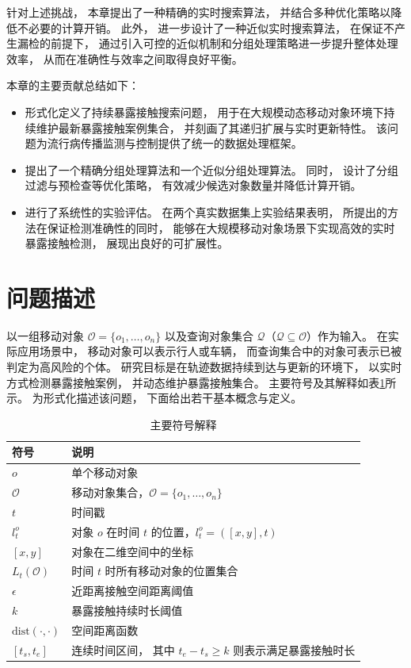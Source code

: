针对上述挑战， 本章提出了一种精确的实时搜索算法， 并结合多种优化策略以降低不必要的计算开销。 此外， 进一步设计了一种近似实时搜索算法， 在保证不产生漏检的前提下， 通过引入可控的近似机制和分组处理策略进一步提升整体处理效率， 从而在准确性与效率之间取得良好平衡。

本章的主要贡献总结如下：

\begin{itemize}
     \item 形式化定义了持续暴露接触搜索问题， 用于在大规模动态移动对象环境下持续维护最新暴露接触案例集合， 并刻画了其递归扩展与实时更新特性。 该问题为流行病传播监测与控制提供了统一的数据处理框架。
     \item 提出了一个精确分组处理算法和一个近似分组处理算法。 同时， 设计了分组过滤与预检查等优化策略， 有效减少候选对象数量并降低计算开销。
     \item 进行了系统性的实验评估。 在两个真实数据集上实验结果表明， 所提出的方法在保证检测准确性的同时， 能够在大规模移动对象场景下实现高效的实时暴露接触检测， 展现出良好的可扩展性。
\end{itemize}

\section{问题描述}
以一组移动对象 $\mathcal{O}=\{o_1,\ldots,o_n\}$ 以及查询对象集合 $\mathcal{Q}$（$\mathcal{Q}\subseteq\mathcal{O}$）作为输入。 在实际应用场景中， 移动对象可以表示行人或车辆， 而查询集合中的对象可表示已被判定为高风险的个体。 研究目标是在轨迹数据持续到达与更新的环境下， 以实时方式检测暴露接触案例， 并动态维护暴露接触集合。 主要符号及其解释如表\ref{contact_tab:symbols}所示。 为形式化描述该问题， 下面给出若干基本概念与定义。

\begin{table}[!ht]
    \caption{主要符号解释}\label{contact_tab:symbols}
    \begin{tabular}{ll}
    \toprule
    符号 & 说明 \\
    \midrule
    $o$ & 单个移动对象 \\
    $\mathcal{O}$ & 移动对象集合，$\mathcal{O}=\{o_1,\ldots,o_n\}$ \\
    $t$ & 时间戳 \\
    $l_t^o$ & 对象 $o$ 在时间 $t$ 的位置，$l_t^o=([x,y],t)$ \\
    $[x,y]$ & 对象在二维空间中的坐标 \\
    $L_t(\mathcal{O})$ & 时间 $t$ 时所有移动对象的位置集合 \\
    $\epsilon$ & 近距离接触空间距离阈值 \\
    $k$ & 暴露接触持续时长阈值 \\
    $\mathrm{dist}(\cdot,\cdot)$ & 空间距离函数 \\
    $[t_s,t_e]$ & 连续时间区间， 其中 $t_e - t_s \ge k$ 则表示满足暴露接触时长 \\
    \bottomrule
    \end{tabular}
    \end{table}

